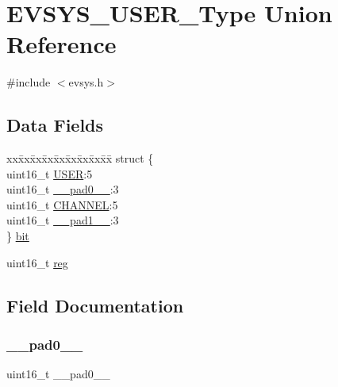 \hypertarget{union_e_v_s_y_s___u_s_e_r___type}{}\section{E\+V\+S\+Y\+S\+\_\+\+U\+S\+E\+R\+\_\+\+Type Union Reference}
\label{union_e_v_s_y_s___u_s_e_r___type}


{\ttfamily \#include $<$evsys.\+h$>$}

\subsection*{Data Fields}
\begin{DoxyCompactItemize}
\item 
\begin{tabbing}
xx\=xx\=xx\=xx\=xx\=xx\=xx\=xx\=xx\=\kill
struct \{\\
\>uint16\_t \mbox{\hyperlink{union_e_v_s_y_s___u_s_e_r___type_a62f18bc3226d5fc3d8c9b8da9b227129}{USER}}:5\\
\>uint16\_t \mbox{\hyperlink{union_e_v_s_y_s___u_s_e_r___type_a77132c2c26a75f5b8751b235cda23828}{\_\_pad0\_\_}}:3\\
\>uint16\_t \mbox{\hyperlink{union_e_v_s_y_s___u_s_e_r___type_a3c9085af638af4df32a11a7e9e199249}{CHANNEL}}:5\\
\>uint16\_t \mbox{\hyperlink{union_e_v_s_y_s___u_s_e_r___type_ab72e3a1f2f7db8695c60c658f5a0f11a}{\_\_pad1\_\_}}:3\\
\} \mbox{\hyperlink{union_e_v_s_y_s___u_s_e_r___type_a53887788396d8006a774a630d695a2c8}{bit}}\\

\end{tabbing}\item 
uint16\+\_\+t \mbox{\hyperlink{union_e_v_s_y_s___u_s_e_r___type_a11760f5020019f4aa8cb02e694f7cc44}{reg}}
\end{DoxyCompactItemize}


\subsection{Field Documentation}
\mbox{\label{union_e_v_s_y_s___u_s_e_r___type_a77132c2c26a75f5b8751b235cda23828}} 
\subsubsection{\texorpdfstring{\_\_pad0\_\_}{\_\_pad0\_\_}}
{\footnotesize\ttfamily uint16\+\_\+t \+\_\+\+\_\+pad0\+\_\+\+\_\+}

